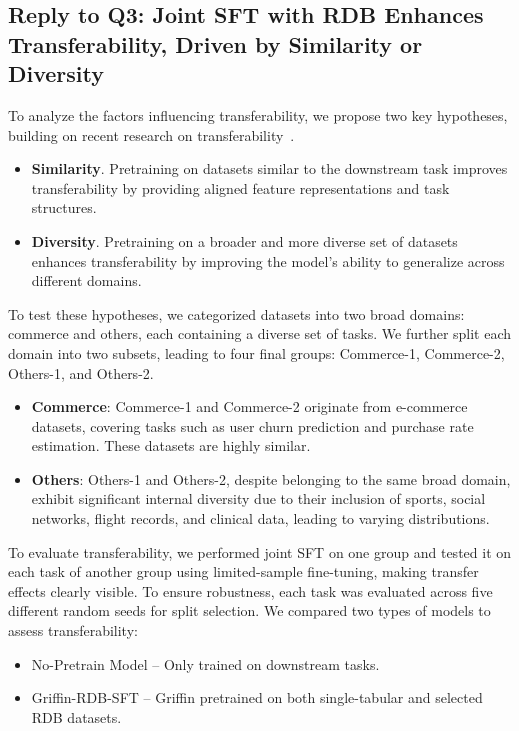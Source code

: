 \documentclass{article}
\theoremstyle{plain}
\theoremstyle{definition}
\theoremstyle{remark}
\begin{document}
\subsection{Reply to Q3: Joint SFT with RDB Enhances Transferability, Driven by Similarity or Diversity}  
To analyze the factors influencing transferability, we propose two key hypotheses, building on recent research on transferability~\citep{ehrig2024impact}.  
\begin{itemize}[itemsep=2pt,topsep=-2pt,parsep=0pt,leftmargin=10pt]
    \item \textbf{Similarity}. Pretraining on datasets similar to the downstream task improves transferability by providing aligned feature representations and task structures.
    \item \textbf{Diversity}. Pretraining on a broader and more diverse set of datasets enhances transferability by improving the model’s ability to generalize across different domains.
\end{itemize}
To test these hypotheses, we categorized datasets into two broad domains: commerce and others, each containing a diverse set of tasks. We further split each domain into two subsets, leading to four final groups: Commerce-1, Commerce-2, Others-1, and Others-2.
\begin{itemize}[itemsep=2pt,topsep=-2pt,parsep=0pt,leftmargin=10pt]
	\item \textbf{Commerce}: Commerce-1 and Commerce-2 originate from e-commerce datasets, covering tasks such as user churn prediction and purchase rate estimation. These datasets are highly similar.
	\item \textbf{Others}: Others-1 and Others-2, despite belonging to the same broad domain, exhibit significant internal diversity due to their inclusion of sports, social networks, flight records, and clinical data, leading to varying distributions.
\end{itemize}

To evaluate transferability, we performed joint SFT on one group and tested it on each task of another group using limited-sample fine-tuning, making transfer effects clearly visible. To ensure robustness, each task was evaluated across five different random seeds for split selection. We compared two types of models to assess transferability:
\begin{itemize}[itemsep=2pt,topsep=-2pt,parsep=0pt,leftmargin=10pt]
	\item No-Pretrain Model – Only trained on downstream tasks.
	\item Griffin-RDB-SFT – Griffin pretrained on both single-tabular and selected RDB datasets.
\end{itemize}
\end{document}
